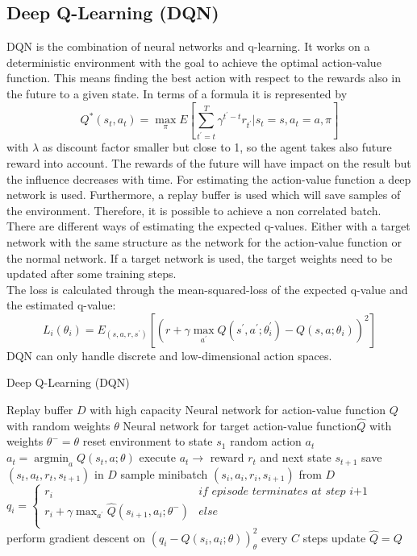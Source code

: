 \subsection{Deep Q-Learning (DQN) }
\nocite{mnih2015human}
\nocite{mnih2013playing}
\label{sec:DQN}
DQN is the combination of neural networks and q-learning. It works on a 
deterministic environment with the goal to achieve the optimal action-value 
function. This means finding the best action with respect to the rewards also 
in the future to a given state. In terms of a formula it is represented by \[ 
Q^*(s_t,a_t)=\max_\pi E\left[
\sum_{t^{'}=t}^{T}\gamma^{t^{'}-t}r_{t^{'}}|s_t=s,
a_t=a, \pi \right] 
\]
 with $\lambda$ as discount factor smaller but close to 1, 
so the agent takes also future reward into account. The rewards of the future 
will have impact on the result but the influence decreases with time. For 
estimating the action-value function a deep network is used. Furthermore, a 
replay buffer is used which will save samples of the environment. Therefore, it 
is possible to achieve a non correlated batch. There are different ways of 
estimating the expected q-values. Either with a target network with the same 
structure as the network for the action-value function or the normal network. 
If a target network is used, the target weights need to be updated after some 
training steps.\\
The loss is calculated through the mean-squared-loss of the expected q-value 
and the estimated q-value: \[L_i(\theta_i)=E_{(s,a,r,s^{'})}
\left[\left(r+\gamma \max_{a^{'}} Q(s^{'}, 
a^{'};\theta_i^{'})-Q(s,a;\theta_i)\right)^2\right] \]
DQN can only handle discrete and low-dimensional action spaces.

\begin{algorithm}
	\caption{Deep Q-Learning (DQN)}\label{DQN-algo}
	\begin{algorithmic}
		\REQUIRE Replay buffer $\mathit{D}$ with high capacity
		\REQUIRE Neural network for action-value function $\mathit{Q}$
		with random weights $\theta$
		\REQUIRE Neural network for target action-value function$
		\mathit{\hat{Q}}$ with weights $\theta^-=\theta$
		\STATE reset environment to state $s_1$
		\STATE random action $a_t$
		\ELSE
		\STATE $a_t=\operatorname*{argmin}_a Q(s_t,a;\theta)$
		\ENDIF
		\STATE execute $a_t \rightarrow$ reward $r_t$ and next state 
		$s_{t+1}$
		\STATE save $(s_t, a_t, r_t,s_{t+1})$ in $D$
		\STATE sample minibatch $(s_i, a_i, r_i,s_{i+1})$ from $D$
		\STATE $q_i =
			\begin{cases}
			r_i & \textit{if episode terminates at step i+1}\\
			r_i+\gamma \max_{a^{'}}\hat{Q}(s_{i+1}, a_i;\theta^{-})& 
			else\\			
			\end{cases}$
		\STATE perform gradient descent on $\left(q_i-Q\left(s_i, 
		a_i;\theta\right)\right)^2_\theta$
		\STATE every $C$ steps update $\hat{Q}=Q$
		\ENDFOR
		\ENDFOR
	\end{algorithmic}
\end{algorithm}

